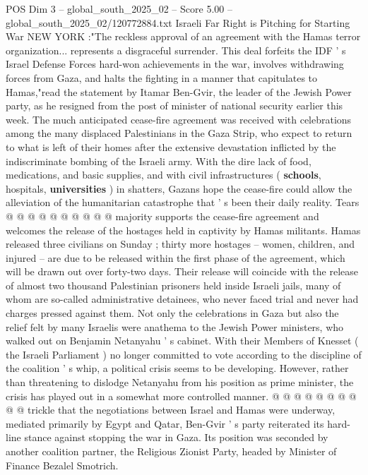 \begin{textsample}{POS Dim 3 – global\_south\_2025\_02 – Score 5.00 – global\_south\_2025\_02/120772884.txt}  \label{ex:f3_pos_417}
Israeli Far Right is Pitching for Starting War NEW YORK :"The reckless approval of an agreement with the Hamas terror organization... represents a disgraceful surrender.
This deal forfeits the IDF ' s Israel Defense Forces hard-won achievements in the war, involves withdrawing forces from Gaza, and halts the fighting in a manner that capitulates to Hamas,"read the statement by Itamar Ben-Gvir, the leader of the Jewish Power party, as he resigned from the post of minister of national security earlier this week.
The much anticipated cease-fire agreement was received with celebrations among the many displaced Palestinians in the Gaza Strip, who expect to return to what is left of their homes after the extensive devastation inflicted by the indiscriminate bombing of the Israeli army.
With the dire lack of food, medications, and basic supplies, and with civil infrastructures ( \textbf{schools}, hospitals, \textbf{universities} ) in shatters, Gazans hope the cease-fire could allow the alleviation of the humanitarian catastrophe that ' s been their daily reality.
Tears @ @ @ @ @ @ @ @ @ @ majority supports the cease-fire agreement and welcomes the release of the hostages held in captivity by Hamas militants.
Hamas released three civilians on Sunday ; thirty more hostages -- women, children, and injured -- are due to be released within the first phase of the agreement, which will be drawn out over forty-two days.
Their release will coincide with the release of almost two thousand Palestinian prisoners held inside Israeli jails, many of whom are so-called administrative detainees, who never faced trial and never had charges pressed against them.
Not only the celebrations in Gaza but also the relief felt by many Israelis were anathema to the Jewish Power ministers, who walked out on Benjamin Netanyahu ' s cabinet.
With their Members of Knesset ( the Israeli Parliament ) no longer committed to vote according to the discipline of the coalition ' s whip, a political crisis seems to be developing.
However, rather than threatening to dislodge Netanyahu from his position as prime minister, the crisis has played out in a somewhat more controlled manner. @ @ @ @ @ @ @ @ @ @ trickle that the negotiations between Israel and Hamas were underway, mediated primarily by Egypt and Qatar, Ben-Gvir ' s party reiterated its hard-line stance against stopping the war in Gaza.
Its position was seconded by another coalition partner, the Religious Zionist Party, headed by Minister of Finance Bezalel Smotrich.

\end{textsample}
